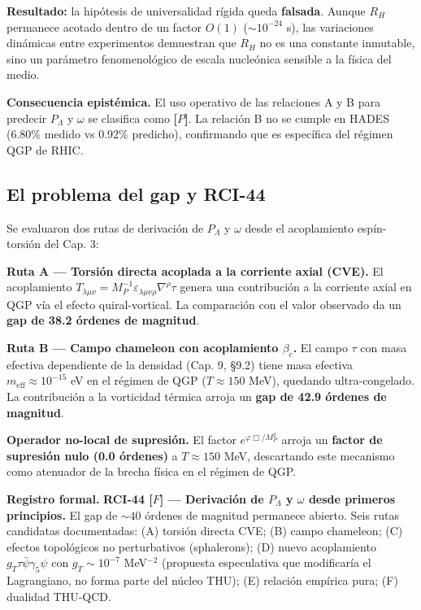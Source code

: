﻿\documentclass[11pt,letterpaper]{article}
\begin{document}
\textbf{Resultado:} la hipótesis de universalidad rígida queda \textbf{falsada}. Aunque $R_H$ permanece acotado dentro de un factor $O(1)$ ($\sim 10^{-24}$ s), las variaciones dinámicas entre experimentos demuestran que $R_H$ no es una constante inmutable, sino un parámetro fenomenológico de escala nucleónica sensible a la física del medio.

\textbf{Consecuencia epistémica.} El uso operativo de las relaciones A y B para predecir $P_\Lambda$ y $\omega$ se clasifica como \textbf{[$P$]}. La relación B no se cumple en HADES (6.80\% medido vs 0.92\% predicho), confirmando que es específica del régimen QGP de RHIC.
\subsection{El problema del gap y RCI-44}
Se evaluaron dos rutas de derivación de $P_\Lambda$ y $\omega$ desde el acoplamiento espín-torsión del Cap. 3:

\textbf{Ruta A — Torsión directa acoplada a la corriente axial (CVE).} El acoplamiento $T_{\lambda\mu\nu} = M_P^{-1}\varepsilon_{\lambda\mu\nu\rho}\nabla^\rho\tau$ genera una contribución a la corriente axial en QGP vía el efecto quiral-vortical. La comparación con el valor observado da un \textbf{gap de 38.2 órdenes de magnitud}.

\textbf{Ruta B — Campo chameleon con acoplamiento $\beta_c$.} El campo $\tau$ con masa efectiva dependiente de la densidad (Cap. 9, §9.2) tiene masa efectiva $m_{\text{eff}} \approx 10^{-15}$ eV en el régimen de QGP ($T \approx 150$ MeV), quedando ultra-congelado. La contribución a la vorticidad térmica arroja un \textbf{gap de 42.9 órdenes de magnitud}.

\textbf{Operador no-local de supresión.} El factor $e^{\varphi \Box / M_P^2}$ arroja un \textbf{factor de supresión nulo (0.0 órdenes)} a $T \approx 150$ MeV, descartando este mecanismo como atenuador de la brecha física en el régimen de QGP.

\textbf{Registro formal.} \textbf{RCI-44 [$F$] — Derivación de $P_\Lambda$ y $\omega$ desde primeros principios.} El gap de $\sim 40$ órdenes de magnitud permanece abierto. Seis rutas candidatas documentadas: (A) torsión directa CVE; (B) campo chameleon; (C) efectos topológicos no perturbativos (sphalerons); (D) nuevo acoplamiento $g_T \tau\bar{\psi}\gamma_5\psi$ con $g_T \sim 10^{-7}$ MeV$^{-2}$ (propuesta especulativa que modificaría el Lagrangiano, no forma parte del núcleo THU); (E) relación empírica pura; (F) dualidad THU-QCD.
\end{document}
